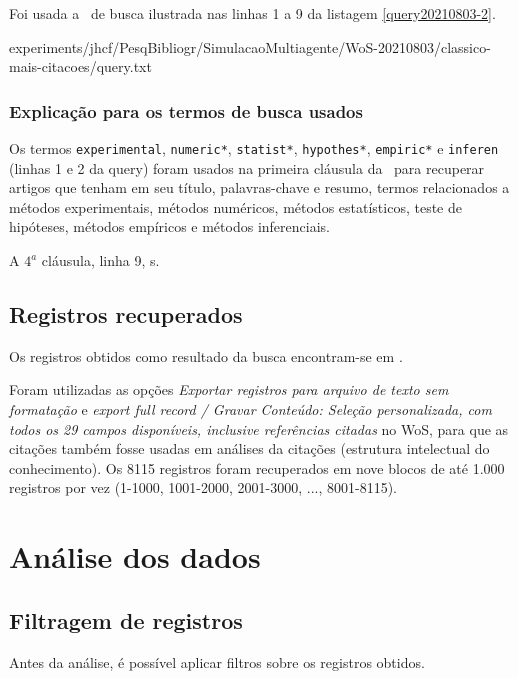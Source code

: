 Foi usada a \query\  de busca ilustrada nas linhas 1 a 9 da listagem \ref{query20210803-2}.


{experiments/jhcf/PesqBibliogr/SimulacaoMultiagente/WoS-20210803/classico-mais-citacoes/query.txt}

\subsubsection{Explicação para os termos de busca usados\label{}}


Os termos \texttt{experimental}, \texttt{numeric*}, \texttt{statist*}, \texttt{hypothes*}, 
\texttt{empiric*}
e \texttt{inferen} (linhas 1 e 2 da query) foram usados na primeira cláusula da \query\  para recuperar artigos que tenham em seu título, palavras-chave e resumo, termos relacionados a métodos experimentais,
métodos numéricos,
métodos estatísticos,
teste de hipóteses,
métodos empíricos e métodos inferenciais.


A $4^{a}$ cláusula, linha 9,  s.

\subsection{Registros recuperados}

Os  registros obtidos como resultado da busca encontram-se em \url{}. 

Foram utilizadas as opções \textit{Exportar registros para arquivo de texto sem formatação} e \textit{export full record / Gravar Conteúdo: Seleção personalizada, com todos os 29 campos disponíveis, inclusive referências citadas} no WoS, para que as citações também fosse usadas em análises da citações (estrutura intelectual do conhecimento). Os 8115 registros foram recuperados em nove blocos de até 1.000 registros por vez (1-1000, 1001-2000, 2001-3000, ..., 8001-8115).


\section{Análise dos dados}

\subsection{Filtragem de registros}
Antes da análise, é possível aplicar filtros sobre os registros obtidos.

